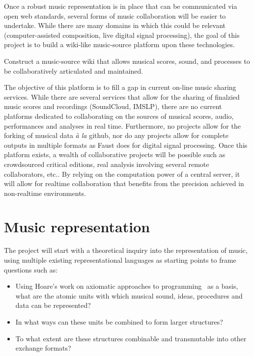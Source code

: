 \documentclass{article}
\begin{document}
Once a robust music representation is in place that can be communicated via
open web standards, several forms of music collaboration will be easier to
undertake. While there are many domains in which this could be relevant
(computer-assisted composition, live digital signal processing), the goal of
this project is to build a wiki-like music-source platform upon
these technologies.  
\begin{objective}
Construct a music-source wiki that allows musical scores, sound, and
processes to be collaboratively articulated and maintained.
\end{objective}
The objective of this platform is to fill a gap in
current on-line music sharing services. While there are several services
that allow for the sharing of finalzied music scores and recordings (SoundCloud,
IMSLP), there are no current platforms dedicated to collaborating on
the sources of musical scores, audio, performances and analyses in real time.
Furthermore,
no projects allow for the forking of musical data \emph{\`a la} github, nor
do any projects allow for complete outputs in multiple formats as Faust does
for digital signal processing.  Once this platform exists, a wealth of
collaborative projects will be possible such as crowdsourced critical
editions, real analysis involving several remote collaborators, etc.. By
relying on the computation power of a central server, it will allow for
realtime collaboration that benefits from the precision achieved in
non-realtime environments.
\section{Music representation}\label{sec:music-representation}
The project will start with a theoretical inquiry into the representation of
music, using multiple existing representational languages as starting points
to frame questions such as:
\begin{itemize}
\item Using Hoare's work on axiomatic approaches to
programming~\cite{hoare1969axiomatic} as a basis, what are the atomic units
with which musical sound, ideas, procedures and data can be represented?
\item In what ways can these units be combined to form
larger structures?
\item To what extent are these structures combinable and transmutable into
other exchange formats?
\end{itemize}
\end{document}
